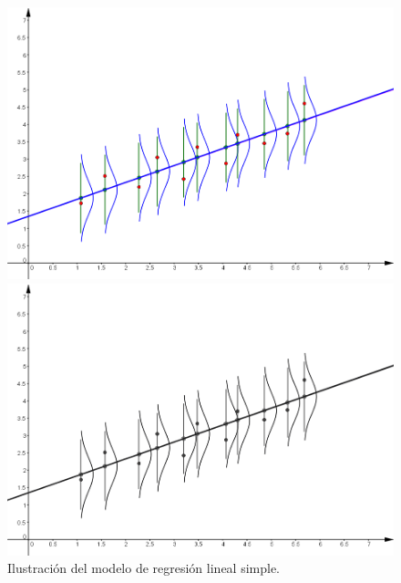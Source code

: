     \begin{figure}[htb]
	\centering
	\begin{enColor}
    \includegraphics[width=12cm]{../fig/Cap10-ModeloRegresionLinealSimple.png}
	\end{enColor}
	\begin{bn}
    \includegraphics[width=12cm]{../fig/Cap10-ModeloRegresionLinealSimple-bn.png}
	\end{bn}
	\caption{Ilustración del modelo de regresión lineal simple.}
	\label{cap04:fig:ModeloRegresionLinealSimple}
    \end{figure}



